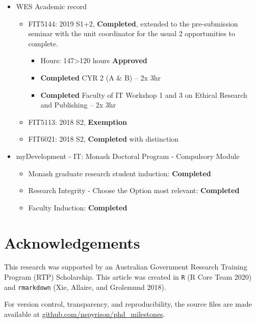 \documentclass[
  11,
]{article}
\providecommand{\tightlist}{%
  \setlength{\itemsep}{0pt}\setlength{\parskip}{0pt}}
\begin{document}
\begin{itemize}
\tightlist
\item
  WES Academic record

  \begin{itemize}
  \tightlist
  \item
    FIT5144: 2019 S1+2, \textbf{Completed}, extended to the pre-submission seminar with the unit coordinator for the usual 2 opportunities to complete.

    \begin{itemize}
    \tightlist
    \item
      Hours: 147\textgreater120 hours \textbf{Approved}
    \item
      \textbf{Completed} CYR 2 (A \& B) -- 2x 3hr
    \item
      \textbf{Completed} Faculty of IT Workshop 1 and 3 on Ethical Research and Publishing -- 2x 3hr
    \end{itemize}
  \item
    FIT5113: 2018 S2, \textbf{Exemption}
  \item
    FIT6021: 2018 S2, \textbf{Completed} with distinction
  \end{itemize}
\item
  myDevelopment - IT: Monash Doctoral Program - Compulsory Module

  \begin{itemize}
  \tightlist
  \item
    Monash graduate research student induction: \textbf{Completed}
  \item
    Research Integrity - Choose the Option most relevant: \textbf{Completed}
  \item
    Faculty Induction: \textbf{Completed}
  \end{itemize}
\end{itemize}

\hypertarget{sec:acknowledgements}{%
\section{Acknowledgements}\label{sec:acknowledgements}}

This research was supported by an Australian Government Research Training Program (RTP) Scholarship. This article was created in \texttt{R} (R Core Team 2020) and \texttt{rmarkdown} (Xie, Allaire, and Grolemund 2018).

For version control, transparency, and reproducibility, the source files are made available at \href{https://github.com/nspyrison/phd_milestones}{github.com/nspyrison/phd\_milestones}.
\end{document}
